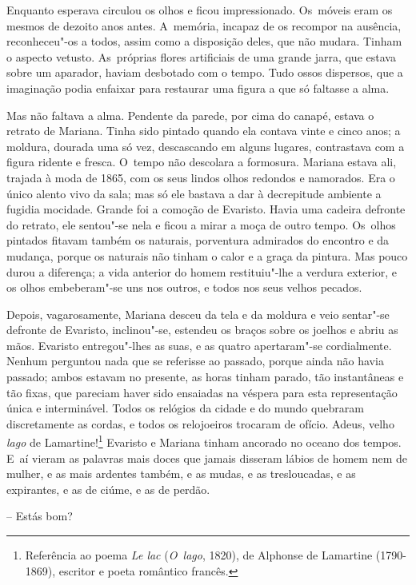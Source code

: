 Enquanto esperava circulou os olhos e ficou impressionado. Os~móveis
eram os mesmos de dezoito anos antes. A~memória, incapaz de os recompor
na ausência, reconheceu"-os a todos, assim como a disposição deles, que
não mudara. Tinham o aspecto vetusto. As~próprias flores artificiais de
uma grande jarra, que estava sobre um aparador, haviam desbotado com o
tempo. Tudo ossos dispersos, que a imaginação podia enfaixar para
restaurar uma figura a que só faltasse a alma.

Mas não faltava a alma. Pendente da parede, por cima do canapé, estava o
retrato de Mariana. Tinha sido pintado quando ela contava vinte e cinco
anos; a moldura, dourada uma só vez, descascando em alguns lugares,
contrastava com a figura ridente e fresca. O~tempo não descolara a
formosura. Mariana estava ali, trajada à moda de 1865, com os seus
lindos olhos redondos e namorados. Era o único alento vivo da sala; mas
só ele bastava a dar à decrepitude ambiente a fugidia mocidade. Grande
foi a comoção de Evaristo. Havia uma cadeira defronte do retrato, ele
sentou"-se nela e ficou a mirar a moça de outro tempo. Os~olhos pintados
fitavam também os naturais, porventura admirados do encontro e da
mudança, porque os naturais não tinham o calor e a graça da pintura. Mas
pouco durou a diferença; a vida anterior do homem restituiu"-lhe a
verdura exterior, e os olhos embeberam"-se uns nos outros, e todos nos
seus velhos pecados.

Depois, vagarosamente, Mariana desceu da tela e da moldura e veio
sentar"-se defronte de Evaristo, inclinou"-se, estendeu os braços sobre os
joelhos e abriu as mãos. Evaristo entregou"-lhes as suas, e as quatro
apertaram"-se cordialmente. Nenhum perguntou nada que se referisse ao
passado, porque ainda não havia passado; ambos estavam no presente, as
horas tinham parado, tão instantâneas e tão fixas, que pareciam haver
sido ensaiadas na véspera para esta representação única e interminável.
Todos os relógios da cidade e do mundo quebraram discretamente as
cordas, e todos os relojoeiros trocaram de ofício. Adeus, velho
\emph{lago} de Lamartine!\footnote{Referência ao poema \emph{Le lac}
  (\emph{O~lago}, 1820), de Alphonse de Lamartine (1790-1869), escritor
  e poeta romântico francês.} Evaristo e Mariana tinham ancorado no
oceano dos tempos. E~aí vieram as palavras mais doces que jamais
disseram lábios de homem nem de mulher, e as mais ardentes também, e as
mudas, e as tresloucadas, e as expirantes, e as de ciúme, e as de
perdão.

-- Estás bom?

